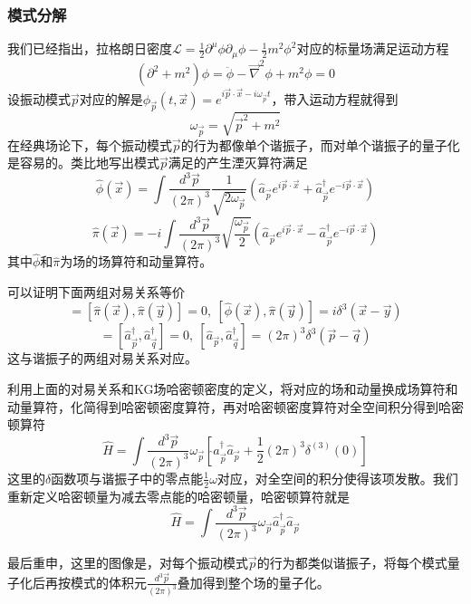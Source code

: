 \documentclass[a4paper,11pt]{ctexart}
\newcommand{\beq}{\begin{equation}}
\newcommand{\eeq}{\end{equation}}
\newcommand{\lagden}{\mathcal{L}}
\begin{document}
\subsubsection{模式分解}
我们已经指出，拉格朗日密度$\lagden = \frac{1}{2} \partial^\mu \phi \partial_\mu \phi - \frac{1}{2}m^2 \phi^2$对应的标量场满足运动方程
\beq
(\partial^2 + m^2) \phi = \ddot{\phi} -\vec{\nabla}^2 \phi+ m^2 \phi = 0
\eeq
设振动模式$\vec{p}$对应的解是$\phi_{\vec{p}} (t,\vec{x}) = e^{i \vec{p} \cdot \vec{x} - i \omega_{\vec{p}} t}$，带入运动方程就得到
\beq
\omega_{\vec{p}} = \sqrt{\vec{p}^2 + m^2}
\eeq
在经典场论下，每个振动模式$\vec{p}$的行为都像单个谐振子，而对单个谐振子的量子化是容易的。类比地写出模式$\vec{p}$满足的产生湮灭算符满足
\beq
\hat{\phi}(\vec{x})  =\int \frac{d^3 \vec{p}}{(2\pi)^3} \frac{1}{\sqrt{2\omega_{\vec{p}}}} (\hat{a}_{\vec{p}} e^{i\vec{p} \cdot \vec{x}} + \hat{a}_{\vec{p}}^\dagger e^{-i\vec{p} \cdot \vec{x}})
\eeq
\beq
\hat{\pi}(\vec{x})  = -i \int \frac{d^3 \vec{p}}{(2\pi)^3} \sqrt{\frac{\omega_{\vec{p}}}{2}}(\hat{a}_{\vec{p}} e^{i\vec{p} \cdot \vec{x}} - \hat{a}_{\vec{p}}^\dagger e^{-i\vec{p} \cdot \vec{x}})
\eeq
其中$\hat{\phi}$和$\hat{\pi}$为场的场算符和动量算符。
\par
可以证明下面两组对易关系等价
\beq
[\hat{\phi}(\vec{x}),\hat{\phi}(\vec{y})] = [\hat{\pi}(\vec{x}),\hat{\pi}(\vec{y})] = 0 ,\ [\hat{\phi}(\vec{x}),\hat{\pi}(\vec{y})] = i\delta^3(\vec{x}-\vec{y})
\eeq
\beq
[\hat{a}_{\vec{p}},\hat{a}_{\vec{q}}] = [\hat{a}_{\vec{p}}^\dagger,\hat{a}_{\vec{q}}^\dagger] = 0 ,\ [\hat{a}_{\vec{p}},\hat{a}_{\vec{q}}^\dagger] = (2\pi)^3 \delta^3(\vec{p}-\vec{q})
\eeq
这与谐振子的两组对易关系对应。
\par
利用上面的对易关系和KG场哈密顿密度的定义，将对应的场和动量换成场算符和动量算符，化简得到哈密顿密度算符，再对哈密顿密度算符对全空间积分得到哈密顿算符
\beq
\hat{H} = \int \frac{d^3 \vec{p}}{(2\pi)^3} \omega_{\vec{p}} \left[\hat{}a_{\vec{p}}^{\dagger} \hat{a}_{\vec{p}}+\frac{1}{2}(2 \pi)^{3} \delta^{(3)}(0)\right]
\eeq
这里的$\delta$函数项与谐振子中的零点能$\frac{1}{2}\omega$对应，对全空间的积分使得该项发散。我们重新定义哈密顿量为减去零点能的哈密顿量，哈密顿算符就是
\beq \label{singleham}
\hat{H} = \int \frac{d^3 \vec{p}}{(2\pi)^3} \omega_{\vec{p}} \hat{a}_{\vec{p}}^\dagger \hat{a}_{\vec{p}}
\eeq
\par
最后重申，这里的图像是，对每个振动模式$\vec{p}$的行为都类似谐振子，将每个模式量子化后再按模式的体积元$\frac{d^3\vec{p}}{(2\pi)^3}$叠加得到整个场的量子化。
\end{document}
